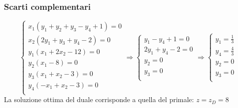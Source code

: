 \documentclass[\main/main.tex]{subfiles}
\begin{document}
\subsubsection*{Scarti complementari}
\[
  \begin{cases}
    x_1(y_1 + y_2 + y_3 -y_4 +1)=0  \\
    x_2(2y_1 + y_3 + y_4     -2 )=0 \\
    y_1(x_1 + 2x_2 -12)=0           \\
    y_2(x_1        -8 )=0           \\
    y_3(x_1 + x_2  -3 )=0           \\
    y_4(-x_1 + x_2 -3 )=0           \\
  \end{cases}
  \Rightarrow
  \begin{cases}
    y_1 -y_4 +1=0  \\
    2y_1 + y_4-2=0 \\
    y_2=0          \\
    y_3=0          \\
  \end{cases}
  \Rightarrow
  \begin{cases}
    y_1=\frac{1}{3} \\
    y_4=\frac{4}{3} \\
    y_2=0           \\
    y_3=0           \\
  \end{cases}
\]
La soluzione ottima del duale corrisponde a quella del primale: $z = z_D = 8$
\end{document}
